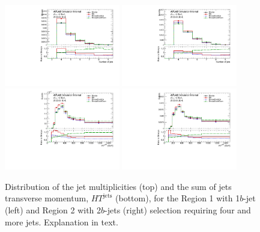 \begin{figure}[!htb]
\centering
\includegraphics[width=0.45\textwidth]{Plots/ttV/c_Region_0_nJets}
\includegraphics[width=0.45\textwidth]{Plots/ttV/c_Region_1_nJets}\\
\includegraphics[width=0.45\textwidth]{Plots/ttV/c_Region_0_HT_jets}
\includegraphics[width=0.45\textwidth]{Plots/ttV/c_Region_1_HT_jets}\\
  \caption{Distribution of the jet multiplicities (top) and the sum of jets transverse momentum, $HT^{\text{jets}}$ (bottom), for the Region 1 with 1$b$-jet (left) and Region 2 with 2$b$-jets (right) selection requiring four and more jets. Explanation in text. \label{ttV:4j12b}}
\end{figure}


